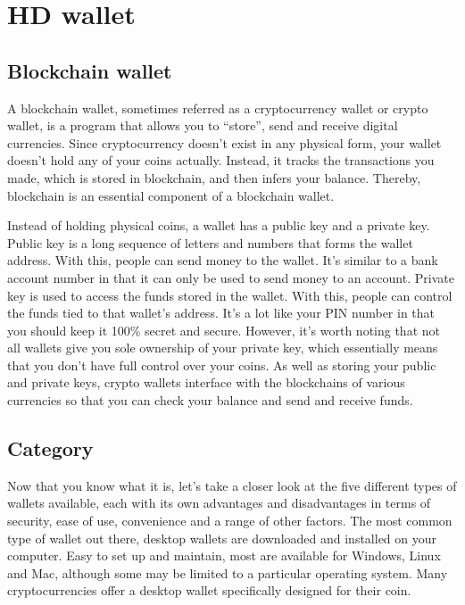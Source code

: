 \section{HD wallet}
\label{sec:hd_wallet}

\subsection{Blockchain wallet}
A blockchain wallet, sometimes referred as a cryptocurrency wallet or crypto wallet, is a program that allows you to “store”, send and receive digital currencies. Since cryptocurrency doesn’t exist in any physical form, your wallet doesn’t hold any of your coins actually. Instead, it tracks the transactions you made, which is stored in blockchain, and then infers your balance. Thereby, blockchain is an essential component of a blockchain wallet.

Instead of holding physical coins, a wallet has a public key and a private key. Public key is a long sequence of letters and numbers that forms the wallet address. With this, people can send money to the wallet. It's similar to a bank account number in that it can only be used to send money to an account. Private key is used to access the funds stored in the wallet. With this, people can control the funds tied to that wallet's address. It's a lot like your PIN number in that you should keep it 100\% secret and secure. However, it's worth noting that not all wallets give you sole ownership of your private key, which essentially means that you don't have full control over your coins. As well as storing your public and private keys, crypto wallets interface with the blockchains of various currencies so that you can check your balance and send and receive funds.

\subsection{Category}

Now that you know what it is, let’s take a closer look at the five different types of wallets available, each with its own advantages and disadvantages in terms of security, ease of use, convenience and a range of other factors. The most common type of wallet out there, desktop wallets are downloaded and installed on your computer. Easy to set up and maintain, most are available for Windows, Linux and Mac, although some may be limited to a particular operating system. Many cryptocurrencies offer a desktop wallet specifically designed for their coin.

